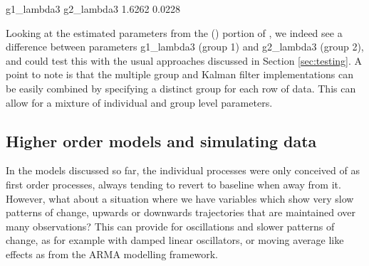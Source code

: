 \documentclass[nojss]{jss}\usepackage[]{graphicx}\usepackage[]{color}
\begin{document}
\begin{Schunk}
\begin{Soutput}
g1_lambda3 g2_lambda3 
    1.6262     0.0228 
\end{Soutput}
\end{Schunk}

Looking at the estimated parameters from the  () portion of , we indeed see a difference between parameters g1\_lambda3 (group 1) and g2\_lambda3 (group 2), and could test this with the usual approaches discussed in Section \ref{sec:testing}. A point to note is that the multiple group and Kalman filter implementations can be easily combined by specifying a distinct group for each row of data. This can allow for a mixture of individual and group level parameters.

\subsection{Higher order models and simulating data} \label{sec:diffusiondynamics}\nopagebreak
In the models discussed so far, the individual processes were only conceived of as first order processes, always tending to revert to baseline when away from it. However, what about a situation where we have variables which show very slow patterns of change, upwards or downwards trajectories that are maintained over many observations? This can provide for oscillations and slower patterns of change, as for example with damped linear oscillators, or moving average like effects as from the ARMA modelling framework.
\end{document}
